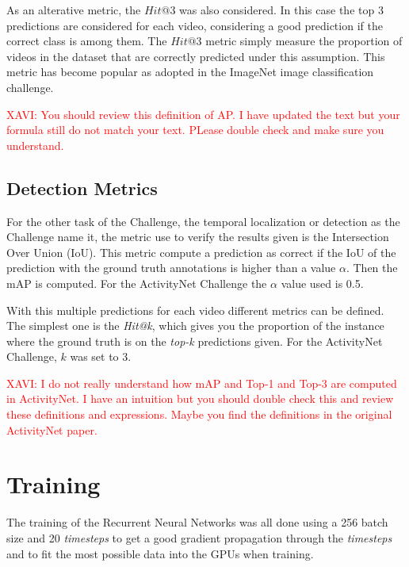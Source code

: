 As an alterative metric, the $Hit@3$ was also considered. In this case the top 3 predictions are considered for each video, considering a good prediction if the correct class is among them. The $Hit@3$ metric simply measure the proportion of videos in the dataset that are correctly predicted under this assumption. This metric has become popular as adopted in the ImageNet image classification challenge.

\textcolor{red}{XAVI: You should review this definition of AP. I have updated the text but your formula still do not match your text. PLease double check and make sure you understand. }

\subsection{Detection Metrics}

For the other task of the Challenge, the temporal localization or detection as the Challenge name it, the metric use to verify the results given is the Intersection Over Union (IoU). This metric compute a prediction as correct if the IoU of the prediction with the ground truth annotations is higher than a value $\alpha$. Then the mAP is computed. For the ActivityNet Challenge the $\alpha$ value used is 0.5.

With this multiple predictions for each video different metrics can be defined. The simplest one is the \textit{Hit@k}, which gives you the proportion of the instance where the ground truth is on the \textit{top-k} predictions given. For the ActivityNet Challenge, $k$ was set to 3.

\textcolor{red}{XAVI: I do not really understand how mAP and Top-1 and Top-3 are computed in ActivityNet. I have an intuition but you should double check this and review these definitions and expressions. Maybe you find the definitions in the original ActivityNet paper. }
 

\section{Training}

The training of the Recurrent Neural Networks was all done using a 256 batch size and 20 \textit{timesteps} to get a good gradient propagation through the \textit{timesteps} and to fit the most possible data into the GPUs when training.


